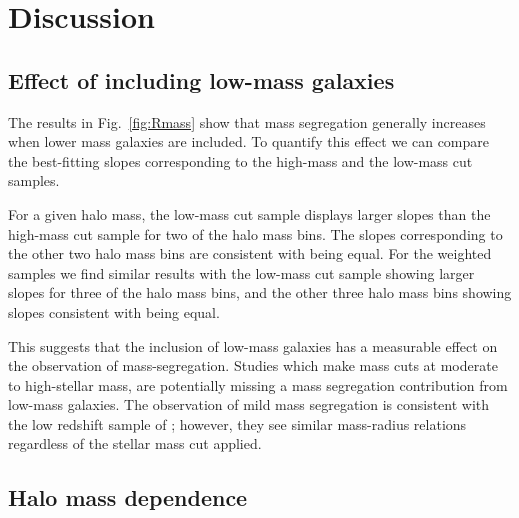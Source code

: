 \section{Discussion}
\label{sec:discussion_ms}

\subsection{Effect of including low-mass galaxies}

The results in Fig.~\ref{fig:Rmass} show that mass segregation
generally increases when lower mass galaxies are included.  To
quantify this effect we can compare the best-fitting slopes
corresponding to the high-mass and the low-mass cut samples.
\par
For a given halo mass, the low-mass cut sample displays larger slopes
than the high-mass cut sample for two of the halo mass bins.  The
slopes corresponding to the other two halo mass bins are consistent
with being equal.  For the weighted samples we find similar results
with the low-mass cut sample showing larger slopes for three of the
halo mass bins, and the other three halo mass bins showing slopes
consistent with being equal.
\par
This suggests that the inclusion of low-mass galaxies has a measurable
effect on the observation of mass-segregation.  Studies which make
mass cuts at moderate to high-stellar mass, are potentially missing a
mass segregation contribution from low-mass galaxies.  The observation
of mild mass segregation is consistent with the low redshift sample of
\citet{ziparo2013}; however, they see similar mass-radius relations
regardless of the stellar mass cut applied.

\subsection{Halo mass dependence}

